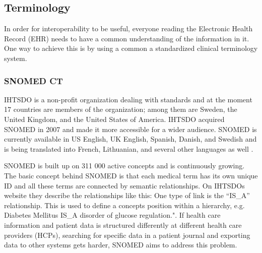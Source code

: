 \documentclass[14pt]{article}
\begin{document}




\subsection{Terminology}
\label{sec:TechnicalStandardsTerminology}
In order for interoperability to be useful, everyone reading the Electronic Health Record (EHR) needs to have a common understanding of the information in it. One way to achieve this is by using a common a standardized clinical terminology system.

\subsubsection{SNOMED CT}

\gls{IHTSDO} is a non-profit organization dealing with standards and at the moment 17 countries are members of the organization; among them are Sweden, the United Kingdom, and the United States of America. \gls{IHTSDO} acquired \gls{SNOMED} in 2007 and made it more accessible for a wider audience. \gls{SNOMED} is currently available in US English, UK English, Spanish, Danish, and Swedish and is being translated into French, Lithuanian, and several other languages as well \cite{ihtsdolang}.

\gls{SNOMED} is built up on 311 000 active concepts and is continuously growing. The basic concept behind \gls{SNOMED} is that each medical term has its own unique ID and all these terms are connected by semantic relationships. On \gls{IHTSDO}s website they describe the relationships like this: One type of link is the “IS\_A” relationship. This is used to define a concepts position within a hierarchy, e.g. Diabetes Mellitus IS\_A disorder of glucose regulation."\cite{ihtsdocomp}. If health care information and patient data is structured differently at different health care providers (HCPs), searching for specific data in a patient journal and exporting data to other systems gets harder, \gls{SNOMED} aims to address this problem.
\end{document}
